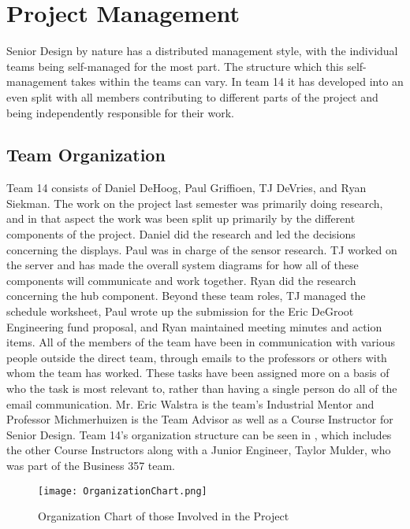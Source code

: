 \documentclass[PPFS.tex]{template/subfiles}
\begin{document}
\section{Project Management}
Senior Design by nature has a distributed management style, with the individual teams being self-managed for the most part. The structure which this self-management takes within the teams can vary. In team 14 it has developed into an even split with all members contributing to different parts of the project and being independently responsible for their work.

    \subsection{Team Organization}
	Team 14 consists of Daniel DeHoog, Paul Griffioen, TJ DeVries, and Ryan Siekman. The work on the project last semester was primarily doing research, and in that aspect the work was been split up primarily by the different components of the project. Daniel did the research and led the decisions concerning the displays. Paul was in charge of the sensor research. TJ worked on the server and has made the overall system diagrams for how all of these components will communicate and work together. Ryan did the research concerning the hub component. Beyond these team roles, TJ managed the schedule worksheet, Paul wrote up the submission for the Eric DeGroot Engineering fund proposal, and Ryan maintained meeting minutes and action items. All of the members of the team have been in communication with various people outside the direct team, through emails to the professors or others with whom the team has worked. These tasks have been assigned more on a basis of who the task is most relevant to, rather than having a single person do all of the email communication. Mr. Eric Walstra is the team's Industrial Mentor and Professor Michmerhuizen is the Team Advisor as well as a Course Instructor for Senior Design. Team 14's organization structure can be seen in , which includes the other Course Instructors along with a Junior Engineer, Taylor Mulder, who was part of the Business 357 team.
	
	\begin{figure}[h]
		\centering
		\texttt{[image: OrganizationChart.png]}
		\caption{Organization Chart of those Involved in the Project}
		\label{fig:OrganizationChart}
	\end{figure}
	
\end{document}
